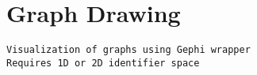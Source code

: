 
\section{Graph Drawing}
\label{sec:graph-drawing}



\begin{verbatim}
Visualization of graphs using Gephi wrapper
Requires 1D or 2D identifier space
\end{verbatim}


